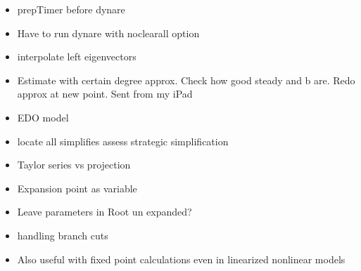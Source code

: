 \documentclass[12pt]{elsart}
\begin{document}
\begin{itemize}
\item prepTimer before dynare
\item Have to run dynare with noclearall option
\item interpolate left eigenvectors
\item 
Estimate with certain degree approx.
Check how good steady and b are. Redo approx at new point.
Sent from my iPad

\item EDO model

\item locate all simplifies assess strategic simplification
\item Taylor series vs projection
\item Expansion point as variable
\item Leave parameters in Root un expanded?
\item handling branch cuts
\item Also useful with fixed point calculations even in linearized nonlinear models


\end{itemize}
\end{document}
